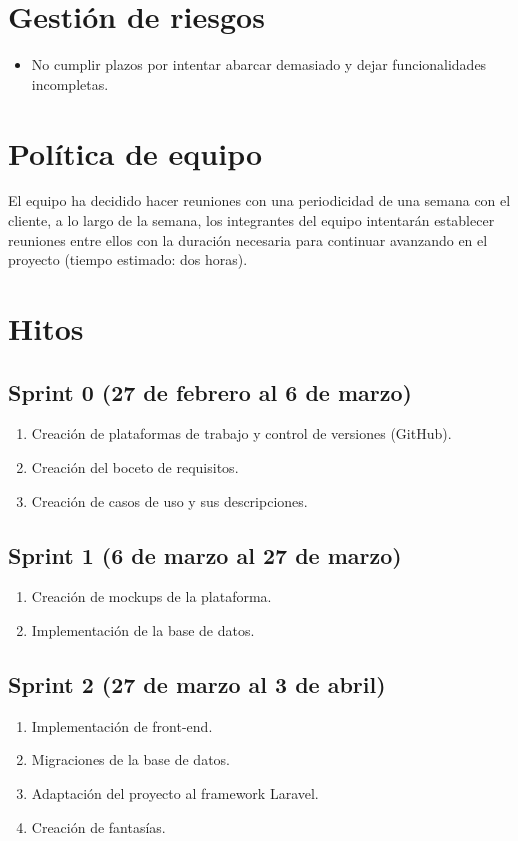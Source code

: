 \section{Gestión de riesgos}
\begin{itemize}
	\item No cumplir plazos por intentar abarcar demasiado y dejar funcionalidades incompletas.
\end{itemize}

\section{Política de equipo}
El equipo ha decidido hacer reuniones con una periodicidad de una semana con el cliente, a lo largo de la semana, los integrantes del equipo intentarán establecer reuniones entre ellos con la duración necesaria para continuar avanzando en el proyecto (tiempo estimado: dos horas).

\section{Hitos} %
\subsection{Sprint 0 (27 de febrero al 6 de marzo)}
\begin{enumerate}
	\item Creación de plataformas de trabajo y control de versiones (GitHub).
	\item Creación del boceto de requisitos.
	\item Creación de casos de uso y sus descripciones.
\end{enumerate}
\subsection{Sprint 1 (6 de marzo al 27 de marzo)}
\begin{enumerate}
	\item Creación de mockups de la plataforma.
	\item Implementación de la base de datos.
\end{enumerate}

\subsection{Sprint 2 (27 de marzo al 3 de abril)}
\begin{enumerate}
	\item Implementación de front-end.
	\item Migraciones de la base de datos.
	\item Adaptación del proyecto al framework Laravel.
	\item Creación de fantasías.
\end{enumerate}

